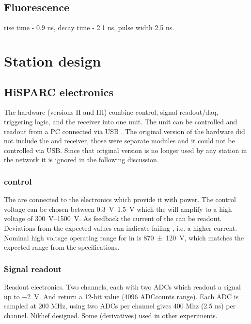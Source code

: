 \subsection{Fluorescence}

rise time - 0.9 ns, decay time - 2.1 ns, pulse width 2.5 ns.



\section{Station design}
\label{sec:station-design}

\subsection{HiSPARC electronics}

The \hisparc hardware (versions II and III) combine \pmt control, signal readout/daq, triggering logic, and the \gps receiver into one unit. The unit can be controlled and readout from a PC connected via USB \cite{messages}. The original version of the \hisparc hardware did not include the \daq and \gps receiver, those were separate modules and it could not be controlled via USB. Since that original version is no longer used by any station in the network it is ignored in the following discussion.


\subsubsection{\pmt control}

The \pmts are connected to the \hisparc electronics which provide it with power. The control voltage can be chosen between \SIrange{.3}{1.5}{\volt} which the \pmt will amplify to a high voltage of \SIrange{300}{1500}{\volt}. As feedback the current of the \pmt can be readout. Deviations from the expected values can indicate failing \pmts, i.e. a higher current. Nominal high voltage operating range for \pmts in \hisparc is \SI{870\pm120}{\volt}, which matches the expected range from the \pmt specifications.


\subsubsection{Signal readout}

Readout electronics. Two channels, each with two ADCs which readout a signal up to \SI{-2}{\volt}. And return a 12-bit value (4096 ADCcounts range). Each ADC is sampled at 200 MHz, using two ADCs per channel gives 400 Mhz (2.5 ns) per channel. Nikhef designed. Some (derivatives) used in other experiments.


